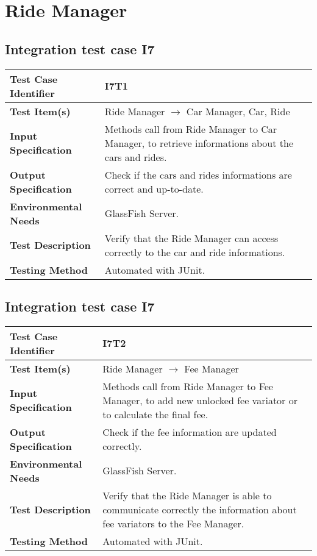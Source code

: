 \section{Ride Manager}
\subsection{Integration test case I7}

\begin{tabular}{l p{}}
    \hline
    \textbf{Test Case Identifier} & I7T1\\
    \hline
    \textbf{Test Item(s)} & Ride Manager $\rightarrow$ Car Manager, Car, Ride\\
    \hline
    \textbf{Input Specification} & Methods call from Ride Manager to Car Manager, to retrieve informations about the cars and rides.\\
    \hline
    \textbf{Output Specification} & Check if the cars and rides informations are correct and up-to-date.\\
    \hline
    \textbf{Environmental Needs} & GlassFish Server. \\
    \hline
    \textbf{Test Description} & Verify that the Ride Manager can access correctly to the car and ride informations.\\
    \hline
    \textbf{Testing Method} & Automated with JUnit.\\
    \hline
\end{tabular}

\subsection{Integration test case I7}

\begin{tabular}{l p{}}
    \hline
    \textbf{Test Case Identifier} & I7T2\\
    \hline
    \textbf{Test Item(s)} & Ride Manager $\rightarrow$ Fee Manager\\
    \hline
    \textbf{Input Specification} & Methods call from Ride Manager to Fee Manager, to add new unlocked fee variator or to calculate the final fee.\\
    \hline
    \textbf{Output Specification} & Check if the fee information are updated correctly.\\
    \hline
    \textbf{Environmental Needs} & GlassFish Server. \\
    \hline
    \textbf{Test Description} & Verify that the Ride Manager is able to communicate correctly the information about fee variators to the Fee Manager.\\
    \hline
    \textbf{Testing Method} & Automated with JUnit.\\
    \hline
\end{tabular}